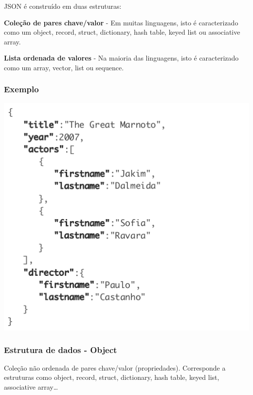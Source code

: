 \documentclass{article}
\begin{document}
JSON é construído em duas estruturas:

\begin{flushleft}
  \textbf{Coleção de pares chave/valor} - Em muitas linguagens, isto é caracterizado como um object, record, struct, dictionary,
  hash table, keyed list ou associative array.

  \textbf{Lista ordenada de valores} - Na maioria das linguagens, isto é caracterizado como um array, vector, list ou sequence.
\end{flushleft}

\pagebreak

\subsubsection*{Exemplo}

\begin{center}
  \includegraphics[scale=0.3]{56}
\end{center}

\subsubsection*{Estrutura de dados - Object}

Coleção não ordenada de pares chave/valor (propriedades). Corresponde a estruturas
como object, record, struct, dictionary, hash table, keyed list, associative array\dots
\end{document}

